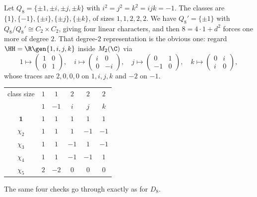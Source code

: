 \begin{example}
	Let $Q_8 = \{\pm1,\pm i,\pm j,\pm k\}$ with $i^2=j^2=k^2=ijk=-1$. The classes are $\{1\},\{-1\},\{\pm i\},\{\pm j\},\{\pm k\}$, of sizes $1,1,2,2,2$. We have $Q_8' = \{\pm1\}$ with $Q_8/Q_8'\cong C_2\times C_2$, giving four linear characters, and then $8 = 4\cdot 1 + d^2$ forces one more of degree $2$. That degree-$2$ representation is the obvious one: regard $\HH = \R\gen{1,i,j,k}$ inside $M_2(\C)$ via
	$$1\mapsto \begin{pmatrix}1&0\\0&1\end{pmatrix},\quad i \mapsto \begin{pmatrix}i&0\\0&-i\end{pmatrix},\quad j\mapsto\begin{pmatrix}0&1\\-1&0\end{pmatrix},\quad k\mapsto\begin{pmatrix}0&i\\i&0\end{pmatrix},$$
	whose traces are $2, 0,0,0$ on $1,i,j,k$ and $-2$ on $-1$.
	\begin{center}
	\renewcommand{\arraystretch}{1.3}
	\setlength{\tabcolsep}{11pt}
	\begin{tabular}{c|ccccc}
	\toprule
	class size & $1$ & $1$ & $2$ & $2$ & $2$\\
	 & $1$ & $-1$ & $i$ & $j$ & $k$\\
	\midrule
	$\mathbf 1$ & $1$ & $1$ & $1$ & $1$ & $1$\\
	$\chi_2$ & $1$ & $1$ & $1$ & $-1$ & $-1$\\
	$\chi_3$ & $1$ & $1$ & $-1$ & $1$ & $-1$\\
	$\chi_4$ & $1$ & $1$ & $-1$ & $-1$ & $1$\\
	$\chi_5$ & $2$ & $-2$ & $0$ & $0$ & $0$\\
	\bottomrule
	\end{tabular}
	\end{center}
	The same four checks go through exactly as for $D_8$.
\end{example}

